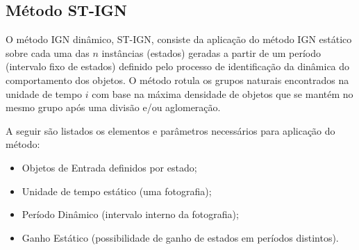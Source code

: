 \begin{figure}[!ht]
	\centering
\end{figure}

\subsection{Método ST-IGN}
\label{stign}
O método \acrshort{IGN} dinâmico, \acrfull{ST-IGN}, consiste da aplicação do método \acrshort{IGN} estático \cite{simposioNeg2003} sobre cada uma das $n$ instâncias (estados) geradas a partir de um período (intervalo fixo de estados) definido pelo processo de identificação da dinâmica do comportamento dos objetos. O método rotula os grupos naturais encontrados na unidade de tempo $i$ com base na máxima densidade de objetos que se mantém no mesmo grupo após uma divisão e/ou aglomeração.

A seguir são listados os elementos e parâmetros necessários para aplicação do método:
\begin{itemize}
\item Objetos de Entrada definidos por estado;
\item Unidade de tempo estático (uma fotografia);
\item Período Dinâmico (intervalo interno da fotografia);
\item Ganho Estático (possibilidade de ganho de estados em períodos distintos).
\end{itemize}

